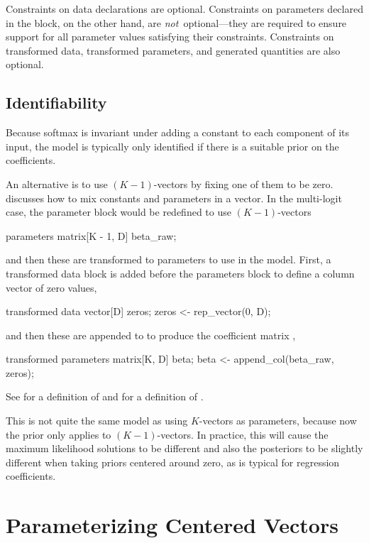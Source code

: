 Constraints on data declarations are optional.  Constraints on
parameters declared in the  block, on the other hand,
are {\it not}\ optional---they are required to ensure support for all
parameter values satisfying their constraints.  Constraints on
transformed data, transformed parameters, and generated quantities are
also optional.

\subsection{Identifiability}

Because softmax is invariant under adding a constant to each component
of its input, the model is typically only identified if there is a
suitable prior on the coefficients.

An alternative is to use $(K-1)$-vectors by fixing one of them to be
zero.  discusses how to mix 
constants and parameters in a vector.  In the multi-logit case, the
parameter block would be redefined to use $(K-1)$-vectors
%
\begin{stancode}
parameters {
  matrix[K - 1, D] beta_raw;
}
\end{stancode}
%
and then these are transformed to parameters to use in the model.
First, a transformed data block is added before the parameters block
to define a column vector of zero values,
%
\begin{stancode}
transformed data {
  vector[D] zeros;
  zeros <- rep_vector(0, D);
}
\end{stancode}
%
and then these are appended to  to produce the
coefficient matrix ,
%
\begin{stancode}
transformed parameters {
  matrix[K, D] beta;
  beta <- append_col(beta_raw, zeros);
}
\end{stancode}
%
See  for a definition of  and
 for a definition of
.

This is not quite the same model as using $K$-vectors as parameters,
because now the prior only applies to $(K-1)$-vectors.  In practice,
this will cause the maximum likelihood solutions to be different and
also the posteriors to be slightly different when taking priors
centered around zero, as is typical for regression coefficients.

\section{Parameterizing Centered Vectors}

